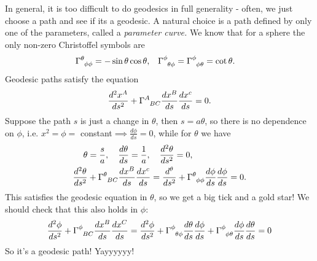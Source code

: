 \documentclass[a4paper, 11pt, normalem]{report}
\begin{document}
\begin{example}
In general, it is too difficult to do geodesics in full generality - often, we just choose a path and see if its a geodesic. 
A natural choice is a path defined by only one of the parameters, called a \emph{parameter curve.}
We know that for a sphere the only non-zero Christoffel symbols are
\begin{align}
    \tensor{\Gamma}{^\theta_{\phi\phi}} &= -\sin\theta\cos\theta, & \tensor{\Gamma}{^\phi_{\theta\phi}} &= \tensor{\Gamma}{^\phi_{\phi\theta}} = \cot\theta.
\end{align}
Geodesic paths satisfy the equation
\begin{align}
    \frac{d^2x^A}{ds^2} + \tensor{\Gamma}{^A_{BC}}\frac{dx^B}{ds}\frac{dx^c}{ds} = 0.
\end{align}
Suppose the path $s$ is just a change in $\theta$, then $s=a\theta$, so there is no dependence on $\phi$, i.e. $x^2=\phi=$ constant$\implies\frac{d\phi}{ds}=0$, while for $\theta$ we have 
\begin{align}
    \theta &= \frac{s}{a},\quad \frac{d\theta}{ds} = \frac{1}{a},\quad \frac{d^2\theta}{ds^2} = 0,\\
    \frac{d^2\theta}{ds^2} &+ \tensor{\Gamma}{^\theta_{BC}}\frac{dx^B}{ds}\frac{dx^c}{ds} = \frac{d^\theta}{ds^2} + \tensor{\Gamma}{^\theta_{\phi\phi}}\frac{d\phi}{ds}\frac{d\phi}{ds} = 0.
\end{align}
This satisfies the geodesic equation in $\theta$, so we get a big tick and a gold star!
We should check that this also holds in $\phi$:
\begin{align}
    \frac{d^2\phi}{ds^2} + \tensor{\Gamma}{^\phi_{BC}}\frac{dx^B}{ds}\frac{dx^C}{ds} = \frac{d^2\phi}{ds^2} + \tensor{\Gamma}{^\phi_{\theta\phi}}\frac{d\theta}{ds}\frac{d\phi}{ds} + \tensor{\Gamma}{^\phi_{\phi\theta}}\frac{d\phi}{ds}\frac{d\theta}{ds} = 0
\end{align}
So it's a geodesic path! Yayyyyyy!
\end{example}
\end{document}
